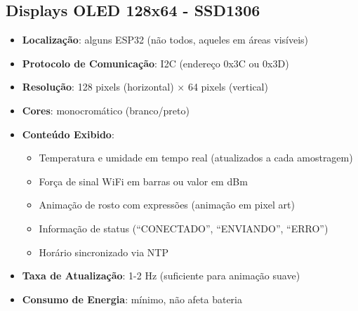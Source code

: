 \documentclass[12pt,a4paper,oneside]{report}
\begin{document}
\subsection{Displays OLED 128x64 - SSD1306}
\begin{itemize}[leftmargin=1.2cm]
    \item \textbf{Localização}: alguns ESP32 (não todos, aqueles em áreas visíveis)
    \item \textbf{Protocolo de Comunicação}: I2C (endereço 0x3C ou 0x3D)
    \item \textbf{Resolução}: 128 pixels (horizontal) × 64 pixels (vertical)
    \item \textbf{Cores}: monocromático (branco/preto)
    \item \textbf{Conteúdo Exibido}:
    \begin{itemize}
        \item Temperatura e umidade em tempo real (atualizados a cada amostragem)
        \item Força de sinal WiFi em barras ou valor em dBm
        \item Animação de rosto com expressões (animação em pixel art)
        \item Informação de status (``CONECTADO'', ``ENVIANDO'', ``ERRO'')
        \item Horário sincronizado via NTP
    \end{itemize}
    \item \textbf{Taxa de Atualização}: 1-2 Hz (suficiente para animação suave)
    \item \textbf{Consumo de Energia}: mínimo, não afeta bateria
\end{itemize}
\end{document}

